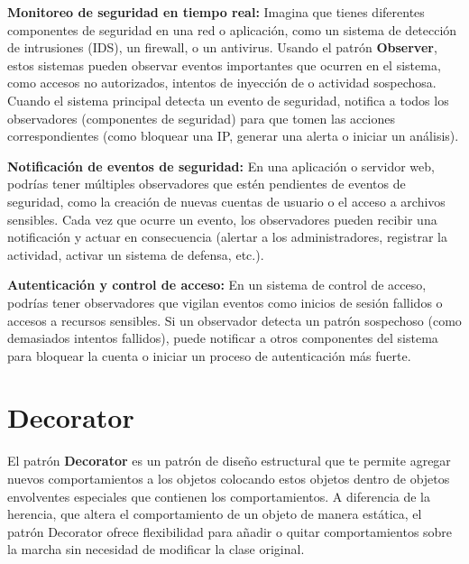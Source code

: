 \textbf{Monitoreo de seguridad en tiempo real:} Imagina que tienes diferentes componentes de seguridad en una red o aplicación, como un sistema de detección de intrusiones (IDS), un firewall, o un antivirus. Usando el patrón \textbf{Observer}, estos sistemas pueden observar eventos importantes que ocurren en el sistema, como accesos no autorizados, intentos de inyección de  o actividad sospechosa. Cuando el sistema principal detecta un evento de seguridad, notifica a todos los observadores (componentes de seguridad) para que tomen las acciones correspondientes (como bloquear una IP, generar una alerta o iniciar un análisis). 

\textbf{Notificación de eventos de seguridad:} En una aplicación o servidor web, podrías tener múltiples observadores que estén pendientes de eventos de seguridad, como la creación de nuevas cuentas de usuario o el acceso a archivos sensibles. Cada vez que ocurre un evento, los observadores pueden recibir una notificación y actuar en consecuencia (alertar a los administradores, registrar la actividad, activar un sistema de defensa, etc.).

\textbf{Autenticación y control de acceso: }En un sistema de control de acceso, podrías tener observadores que vigilan eventos como inicios de sesión fallidos o accesos a recursos sensibles. Si un observador detecta un patrón sospechoso (como demasiados intentos fallidos), puede notificar a otros componentes del sistema para bloquear la cuenta o iniciar un proceso de autenticación más fuerte.

\section{Decorator}

El patrón \textbf{Decorator} es un patrón de diseño estructural que te permite agregar nuevos comportamientos a los objetos colocando estos objetos dentro de objetos envolventes especiales que contienen los comportamientos. A diferencia de la herencia, que altera el comportamiento de un objeto de manera estática, el patrón Decorator ofrece flexibilidad para añadir o quitar comportamientos sobre la marcha sin necesidad de modificar la clase original.

